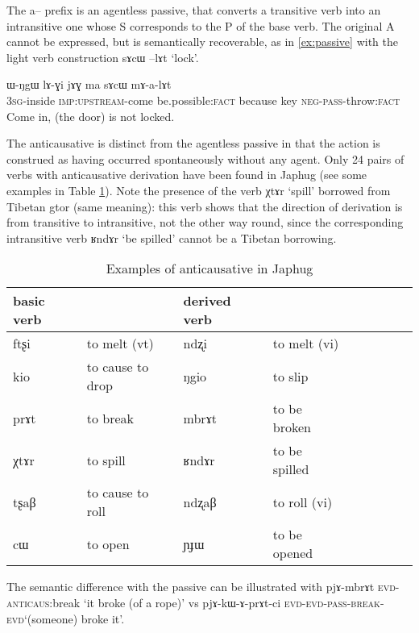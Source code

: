 \documentclass[oldfontcommands,oneside,a4paper,11pt]{article}
\newcommand{\ipa}[1]{{\phon#1}} %
\begin{document}
The  \ipa{a--} prefix is an agentless passive, that converts a transitive verb into an intransitive one whose S corresponds to the P of the base verb. The original A cannot be expressed, but is semantically recoverable, as in \ref{ex:passive} with the light verb construction \ipa{sɤcɯ --lɤt} `lock'. 

\begin{exe}
\ex \label{ex:passive}
\gll 
\ipa{ɯ-ŋgɯ} 	\ipa{lɤ-ɣi} 	\ipa{jɤɣ} 	\ipa{ma} 	\ipa{sɤcɯ} 	\ipa{mɤ-a-lɤt} \\
\textsc{3sg}-inside \textsc{imp:upstream}-come  be.possible:\textsc{fact} because key \textsc{neg-pass}-throw:\textsc{fact} \\
\glt Come in, (the door) is not locked.
\end{exe}

The anticausative is distinct from the agentless passive in that the action is construed as having occurred spontaneously without any agent. Only 24 pairs of verbs with anticausative derivation have been found in Japhug (see some examples in Table \ref{tab:anticausative}). Note the presence of the verb \ipa{χtɤr} `spill' borrowed from Tibetan \ipa{gtor} (same meaning): this verb shows that the direction of derivation is from transitive to intransitive, not the other way round, since the corresponding intransitive verb \ipa{ʁndɤr} `be spilled' cannot be a Tibetan borrowing.


\begin{table}[H]
\caption{Examples of anticausative in Japhug}\label{tab:anticausative}
\begin{tabular}{lllllllll} \toprule
basic verb  & &derived  verb &\\
\midrule
\ipa{ftʂi}  &	to melt (vt)	&		\ipa{ndʐi}  &	to melt (vi)		\\
\ipa{kio}  &	to cause to drop	&		\ipa{ŋgio}  &	to slip		\\
\ipa{prɤt}  &	to break	&		\ipa{mbrɤt}  &		to be broken	\\
\ipa{χtɤr}  &	 to spill	&		\ipa{ʁndɤr}  &		to be spilled	\\
\ipa{tʂaβ}  &	to cause to roll	&		\ipa{ndʐaβ}  &	to roll (vi)		\\
   \ipa{cɯ}  &	 to open 	&		\ipa{ɲɟɯ}  &	 to be opened	 	\\ 
 \bottomrule
\end{tabular}
\end{table}

The semantic difference with the passive can be illustrated with \ipa{pjɤ-mbrɤt} \textsc{evd-anticaus}:break `it broke (of a rope)' vs \ipa{pjɤ-kɯ-ɤ-prɤt-ci} \textsc{evd-evd-pass-break}-\textsc{evd}`(someone) broke it'.
\end{document}
